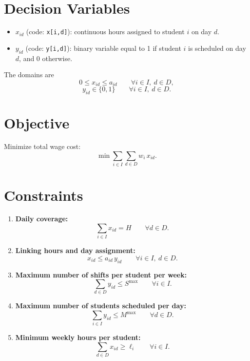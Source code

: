 \section*{Decision Variables}

\begin{itemize}
    \item $x_{id}$ (code: \texttt{x[i,d]}): continuous hours assigned to student $i$ on day $d$.
    \item $y_{id}$ (code: \texttt{y[i,d]}): binary variable equal to 1 if student $i$ is scheduled on day $d$, and 0 otherwise.
\end{itemize}

The domains are
\[
0 \le x_{id} \le a_{id} \qquad \forall i\in I,\ d\in D,
\]
\[
y_{id}\in\{0,1\} \qquad \forall i\in I,\ d\in D.
\]

\section*{Objective}

Minimize total wage cost:
\[
\min \sum_{i\in I}\sum_{d\in D} w_i\,x_{id}.
\]

\section*{Constraints}

\begin{enumerate}
    \item \textbf{Daily coverage:}
    \[
    \sum_{i\in I} x_{id} = H
    \qquad \forall d\in D.
    \]

    \item \textbf{Linking hours and day assignment:}
    \[
    x_{id} \le a_{id}\,y_{id}
    \qquad \forall i\in I,\ d\in D.
    \]

    \item \textbf{Maximum number of shifts per student per week:}
    \[
    \sum_{d\in D} y_{id} \le S^{\max}
    \qquad \forall i\in I.
    \]

    \item \textbf{Maximum number of students scheduled per day:}
    \[
    \sum_{i\in I} y_{id} \le M^{\max}
    \qquad \forall d\in D.
    \]

    \item \textbf{Minimum weekly hours per student:}
    \[
    \sum_{d\in D} x_{id} \ge \ell_i
    \qquad \forall i\in I.
    \]
\end{enumerate}

